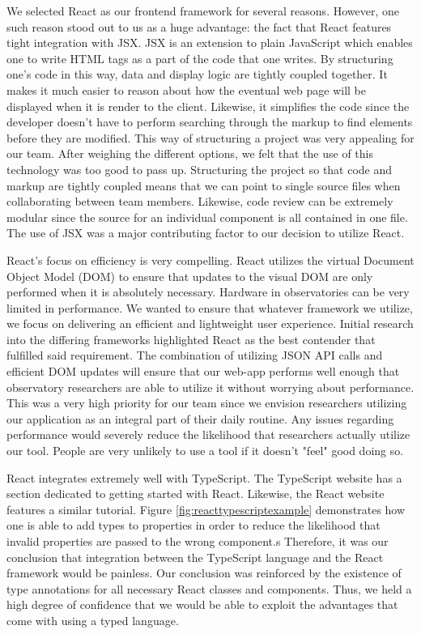 \documentclass[12pt]{report}
\begin{document}
We selected React as our frontend framework for several reasons. However, one such reason stood out to us as a huge advantage: the fact that React features tight integration with JSX. JSX is an extension to plain JavaScript which enables one to write HTML tags as a part of the code that one writes. By structuring one's code in this way, data and display logic are tightly coupled together. It makes it much easier to reason about how the eventual web page will be displayed when it is render to the client. Likewise, it simplifies the code since the developer doesn't have to perform searching through the markup to find elements before they are modified. This way of structuring a project was very appealing for our team. After weighing the different options, we felt that the use of this technology was too good to pass up. Structuring the project so that code and markup are tightly coupled means that we can point to single source files when collaborating between team members. Likewise, code review can be extremely modular since the source for an individual component is all contained in one file. The use of JSX was a major contributing factor to our decision to utilize React.

React's focus on efficiency is very compelling. React utilizes the virtual Document Object Model (DOM) to ensure that updates to the visual DOM are only performed when it is absolutely necessary. Hardware in observatories can be very limited in performance. We wanted to ensure that whatever framework we utilize, we focus on delivering an efficient and lightweight user experience. Initial research into the differing frameworks highlighted React as the best contender that fulfilled said requirement. The combination of utilizing JSON API calls and efficient DOM updates will ensure that our web-app performs well enough that observatory researchers are able to utilize it without worrying about performance. This was a very high priority for our team since we envision researchers utilizing our application as an integral part of their daily routine. Any issues regarding performance would severely reduce the likelihood that researchers actually utilize our tool. People are very unlikely to use a tool if it doesn't "feel" good doing so.

React integrates extremely well with TypeScript. The TypeScript website has a section dedicated to getting started with React.\cite{typescriptreacttutorial} Likewise, the React website features a similar tutorial.\cite{reacttypescripttutorial} Figure \ref{fig:reacttypescriptexample} demonstrates how one is able to add types to properties in order to reduce the likelihood that invalid properties are passed to the wrong component.s Therefore, it was our conclusion that integration between the TypeScript language and the React framework would be painless. Our conclusion was reinforced by the existence of type annotations for all necessary React classes and components. Thus, we held a high degree of confidence that we would be able to exploit the advantages that come with using a typed language.
\end{document}
